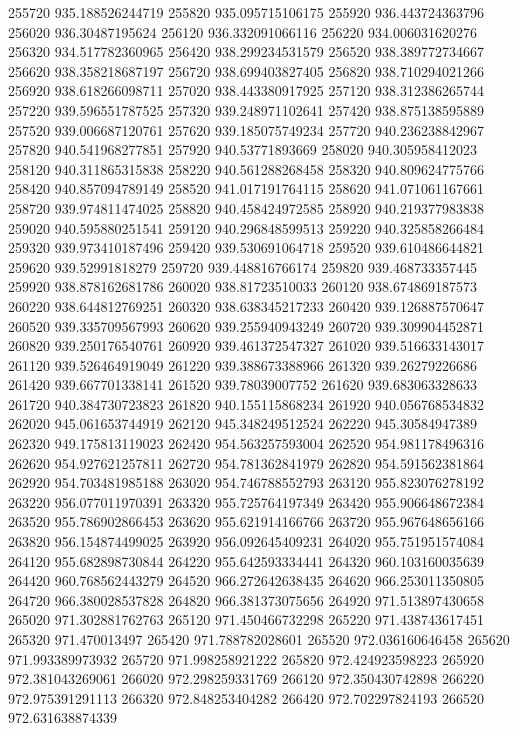 {255720 935.188526244719
255820 935.095715106175
255920 936.443724363796
256020 936.30487195624
256120 936.332091066116
256220 934.006031620276
256320 934.517782360965
256420 938.299234531579
256520 938.389772734667
256620 938.358218687197
256720 938.699403827405
256820 938.710294021266
256920 938.618266098711
257020 938.443380917925
257120 938.312386265744
257220 939.596551787525
257320 939.248971102641
257420 938.875138595889
257520 939.006687120761
257620 939.185075749234
257720 940.236238842967
257820 940.541968277851
257920 940.53771893669
258020 940.305958412023
258120 940.311865315838
258220 940.561288268458
258320 940.809624775766
258420 940.857094789149
258520 941.017191764115
258620 941.071061167661
258720 939.974811474025
258820 940.458424972585
258920 940.219377983838
259020 940.595880251541
259120 940.296848599513
259220 940.325858266484
259320 939.973410187496
259420 939.530691064718
259520 939.610486644821
259620 939.52991818279
259720 939.448816766174
259820 939.468733357445
259920 938.878162681786
260020 938.81723510033
260120 938.674869187573
260220 938.644812769251
260320 938.638345217233
260420 939.126887570647
260520 939.335709567993
260620 939.255940943249
260720 939.309904452871
260820 939.250176540761
260920 939.461372547327
261020 939.516633143017
261120 939.526464919049
261220 939.388673388966
261320 939.26279226686
261420 939.667701338141
261520 939.78039007752
261620 939.683063328633
261720 940.384730723823
261820 940.155115868234
261920 940.056768534832
262020 945.061653744919
262120 945.348249512524
262220 945.30584947389
262320 949.175813119023
262420 954.563257593004
262520 954.981178496316
262620 954.927621257811
262720 954.781362841979
262820 954.591562381864
262920 954.703481985188
263020 954.746788552793
263120 955.823076278192
263220 956.077011970391
263320 955.725764197349
263420 955.906648672384
263520 955.786902866453
263620 955.621914166766
263720 955.967648656166
263820 956.154874499025
263920 956.092645409231
264020 955.751951574084
264120 955.682898730844
264220 955.642593334441
264320 960.103160035639
264420 960.768562443279
264520 966.272642638435
264620 966.253011350805
264720 966.380028537828
264820 966.381373075656
264920 971.513897430658
265020 971.302881762763
265120 971.450466732298
265220 971.438743617451
265320 971.470013497
265420 971.788782028601
265520 972.036160646458
265620 971.993389973932
265720 971.998258921222
265820 972.424923598223
265920 972.381043269061
266020 972.298259331769
266120 972.350430742898
266220 972.975391291113
266320 972.848253404282
266420 972.702297824193
266520 972.631638874339
}
